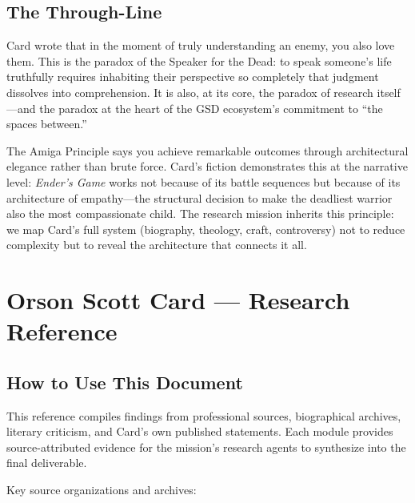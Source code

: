 \documentclass[11pt,letterpaper]{article}
\newcommand{\stageheader}[2]{%
  \noindent\colorbox{#2}{\makebox[\textwidth][l]{%
    \textcolor{white}{\bfseries\sffamily\hspace{6pt}#1\hspace{6pt}}}}%
  \vspace{0.5em}\par%
}
\begin{document}
\subsection{The Through-Line}

Card wrote that in the moment of truly understanding an enemy, you also love them. This is the paradox of the Speaker for the Dead: to speak someone's life truthfully requires inhabiting their perspective so completely that judgment dissolves into comprehension. It is also, at its core, the paradox of research itself---and the paradox at the heart of the GSD ecosystem's commitment to ``the spaces between.''

The Amiga Principle says you achieve remarkable outcomes through architectural elegance rather than brute force. Card's fiction demonstrates this at the narrative level: \textit{Ender's Game} works not because of its battle sequences but because of its architecture of empathy---the structural decision to make the deadliest warrior also the most compassionate child. The research mission inherits this principle: we map Card's full system (biography, theology, craft, controversy) not to reduce complexity but to reveal the architecture that connects it all.

\newpage

\stageheader{STAGE 2 --- RESEARCH REFERENCE}{secondary}

\section{Orson Scott Card --- Research Reference}

\subsection{How to Use This Document}

This reference compiles findings from professional sources, biographical archives, literary criticism, and Card's own published statements. Each module provides source-attributed evidence for the mission's research agents to synthesize into the final deliverable.

Key source organizations and archives:
\end{document}

